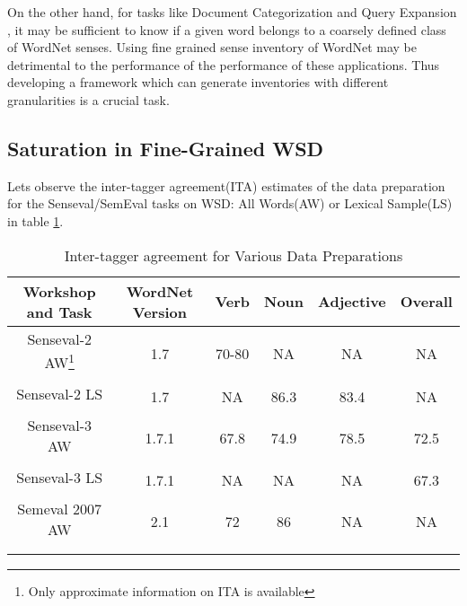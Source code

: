 On the other hand, for tasks like Document Categorization \citep{buitelaar2000reducing} and Query Expansion \citep{moldovan2000using}, it may be sufficient to know if a given word belongs to a coarsely defined class of WordNet senses. Using fine grained sense inventory of WordNet may be detrimental to the performance of the performance of these applications. Thus developing a framework which can generate inventories with different granularities is a crucial task.

\subsection{Saturation in Fine-Grained WSD}%
Lets observe the inter-tagger agreement(ITA) estimates of the data preparation for the Senseval/SemEval tasks on WSD: All Words(AW) or Lexical Sample(LS) in table \ref{tab:itaWSD}.

\begin{center}
\begin{longtable}{| c | c | c | c | c | c |}      
    \hline
Workshop and Task & WordNet Version & Verb & Noun & Adjective & Overall \\\hline 
Senseval-2 AW\footnote{Only approximate information on ITA is available} & \multirow{2}{*}{1.7} & \multirow{2}{*}{70-80} & \multirow{2}{*}{NA} & \multirow{2}{*}{NA} & \multirow{2}{*}{NA} \\ 
\citep{Senseval2AllWordsTask} & & & & & \\ \hline

Senseval-2 LS & \multirow{2}{*}{1.7} & \multirow{2}{*}{NA} & \multirow{2}{*}{86.3} & \multirow{2}{*}{83.4} & \multirow{2}{*}{NA} \\ 
\citep{Senseval2LexicalSampleTask} & & & & & \\ \hline

Senseval-3 AW  & \multirow{2}{*}{1.7.1} & \multirow{2}{*}{67.8} & \multirow{2}{*}{74.9} & \multirow{2}{*}{78.5} & \multirow{2}{*}{72.5}\\ 
\citep{Senseval3AllWordsTask} & & & & & \\ \hline

Senseval-3 LS & \multirow{2}{*}{1.7.1} & \multirow{2}{*}{NA} & \multirow{2}{*}{NA} & \multirow{2}{*}{NA} & \multirow{2}{*}{67.3}\\ 
\citep{Senseval3LexicalSample} & & & & & \\ \hline

Semeval 2007 AW & \multirow{2}{*}{2.1} & \multirow{2}{*}{72} & \multirow{2}{*}{86} & \multirow{2}{*}{NA} & \multirow{2}{*}{NA} \\ 
\citep{Semeval2007WSD} & & & & & \\ \hline
\caption{Inter-tagger agreement for Various Data Preparations} 
\label{tab:itaWSD}
\end{longtable}
\end{center}

